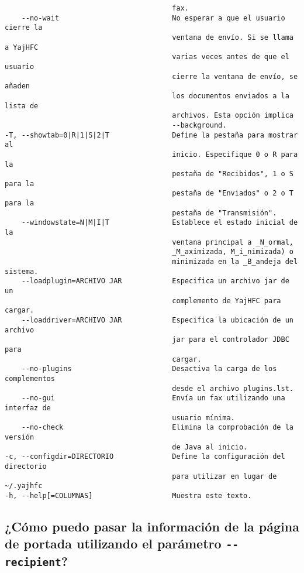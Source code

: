 \documentclass[a4paper,10pt]{scrartcl}
\begin{document}
\begin{verbatim}
                                        fax.
    --no-wait                           No esperar a que el usuario cierre la
                                        ventana de envío. Si se llama a YajHFC
                                        varias veces antes de que el usuario
                                        cierre la ventana de envío, se añaden
                                        los documentos enviados a la lista de
                                        archivos. Esta opción implica
                                        --background.
-T, --showtab=0|R|1|S|2|T               Define la pestaña para mostrar al
                                        inicio. Especifique 0 o R para la
                                        pestaña de "Recibidos", 1 o S para la
                                        pestaña de "Enviados" o 2 o T para la
                                        pestaña de "Transmisión".
    --windowstate=N|M|I|T               Establece el estado inicial de la
                                        ventana principal a _N_ormal,
                                        _M_aximizada, M_i_nimizada) o
                                        minimizada en la _B_andeja del sistema.
    --loadplugin=ARCHIVO JAR            Especifica un archivo jar de un
                                        complemento de YajHFC para cargar.
    --loaddriver=ARCHIVO JAR            Especifica la ubicación de un archivo
                                        jar para el controlador JDBC para
                                        cargar.
    --no-plugins                        Desactiva la carga de los complementos
                                        desde el archivo plugins.lst.
    --no-gui                            Envía un fax utilizando una interfaz de
                                        usuario mínima.
    --no-check                          Elimina la comprobación de la versión
                                        de Java al inicio.
-c, --configdir=DIRECTORIO              Define la configuración del directorio
                                        para utilizar en lugar de ~/.yajhfc
-h, --help[=COLUMNAS]                   Muestra este texto.
\end{verbatim}

\subsection{¿Cómo puedo pasar la información de la página de portada utilizando el parámetro \texttt{-{-}recipient}?}
\end{document}
